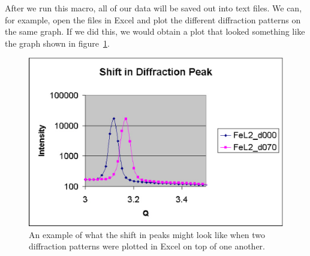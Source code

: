 After we run this macro, all of our data will 
be saved out into text files. We can, for
example, open the files in Excel and plot
the different diffraction patterns on the same
graph. If we did this, we would obtain a plot
that looked something like the graph shown
in figure~\ref{excel_peak_shift}.

\begin{figure}
    \centering
    \includegraphics[scale=.5]{figures/excel_peak_shift.eps}
    \caption{An example of what the shift in peaks might
    look like when two diffraction patterns were plotted
    in Excel on top of one another.}
    \label{excel_peak_shift}
\end{figure}


